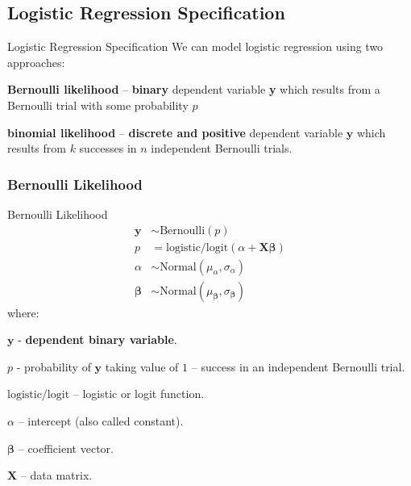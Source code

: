 \subsection{Logistic Regression Specification}
\begin{frame}{Logistic Regression Specification}
    We can model logistic regression using two approaches:
    \begin{vfilleditems}
        \item \textbf{Bernoulli likelihood} --
        \textbf{binary} dependent variable \textbf{y} which results from a
        Bernoulli trial with some probability $p$
        \item \textbf{binomial likelihood} --
        \textbf{discrete and positive} dependent variable $\textbf{y}$
        which results from $k$ successes in $n$ independent Bernoulli
        trials.
    \end{vfilleditems}
\end{frame}

\subsubsection{Bernoulli Likelihood}
\begin{frame}{Bernoulli Likelihood}
    \small
    $$
        \begin{aligned}
            \mathbf{y}         & \sim \text{Bernoulli}\left( p\right)                                      \\
            p                  & = \text{logistic/logit}(\alpha +  \mathbf{X} \boldsymbol{\beta})          \\
            \alpha             & \sim \text{Normal}(\mu_\alpha, \sigma_\alpha)                             \\
            \boldsymbol{\beta} & \sim \text{Normal}(\mu_{\boldsymbol{\beta}}, \sigma_{\boldsymbol{\beta}})
        \end{aligned}
    $$
    where:
    \begin{vfilleditems}
        \item \small $\mathbf{y}$ - \textbf{dependent binary variable}.
        \item \small $p$ - probability of $\mathbf{y}$ taking value of $1$ --
        success in an independent Bernoulli trial.
        \item \small $\text{logistic/logit}$ -- logistic or logit function.
        \item \small $\alpha$ -- intercept (also called constant).
        \item \small $\boldsymbol{\beta}$ -- coefficient vector.
        \item \small $\mathbf{X}$ -- data matrix.
    \end{vfilleditems}
\end{frame}

